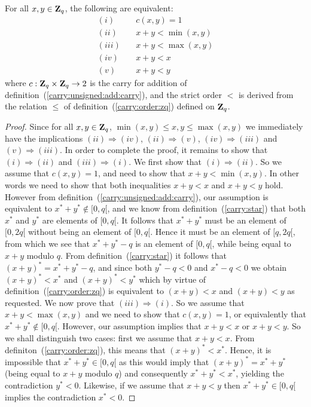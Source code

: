 \documentclass{article}
\newcommand{\zq}{\mbox{${\bf Z}_{q}$}}
\begin{document}
\begin{prop}\label{carry:unsigned:add:criterium}
  For all $x,y\in\zq$, the following are equivalent:
    \begin{eqnarray*}
      (i)&\ &c(x,y) = 1\\
      (ii)&\ & x + y < \min(x,y)\\
      (iii)&\ & x + y < \max(x,y)\\
      (iv)&\ & x + y < x\\
      (v) &\ & x + y < y
    \end{eqnarray*}
where $c:\zq\times\zq\rightarrow 2$ is the carry for addition of 
  definition~(\ref{carry:unsigned:add:carry}), and the strict order $<$
  is derived from the relation $\leq$ of 
  definition~(\ref{carry:order:zq}) defined on \zq.
\end{prop}
\begin{proof}
  Since for all $x,y\in\zq$, $\min(x,y)\leq x, y\leq\max(x,y)$ we immediately 
  have the implications $(ii)\Rightarrow(iv)$, $(ii)\Rightarrow(v)$, 
  $(iv)\Rightarrow(iii)$ and $(v)\Rightarrow(iii)$. In order to complete
  the proof, it remains to show that $(i)\Rightarrow(ii)$ and 
  $(iii)\Rightarrow(i)$. We first show that $(i)\Rightarrow(ii)$. So 
  we assume that $c(x,y) = 1$, and need to show that $x+y<\min(x,y)$.
  In other words we need to show that both inequalities $x+y<x$ and 
  $x+y<y$ hold. However from definition~(\ref{carry:unsigned:add:carry}),
  our assumption is equivalent to $x^{*}+y^{*}\not\in[0,q[$, and we know
  from definition~(\ref{carry:star}) that both $x^{*}$ and $y^{*}$ are elements
  of $[0,q[$. It follows that $x^{*}+y^{*}$ must be an element of $[0,2q[$
  without being an element of $[0,q[$. Hence it must be an element of
  $[q,2q[$, from which we see that $x^{*}+y^{*}-q$ is an element of $[0,q[$,
  while being equal to $x+y$ modulo $q$. From definition~(\ref{carry:star})
  it follows that $(x+y)^{*}=x^{*}+y^{*}-q$, and since both $y^{*}-q <0$ and 
  $x^{*}-q<0$ we obtain $(x+y)^{*}<x^{*}$ and $(x+y)^{*}<y^{*}$ which by
  virtue of definition~(\ref{carry:order:zq}) is equivalent to $(x+y)<x$ and 
  $(x+y)<y$ as requested. We now prove that $(iii)\Rightarrow(i)$. So we
  assume that $x+y <\max(x,y)$ and we need to show that $c(x,y)=1$, or
  equivalently that $x^{*}+y^{*}\not\in[0,q[$. However, our assumption
  implies that $x+y<x$ or $x+y<y$. So we shall distinguish two cases:
  first we assume that $x+y<x$. From definiton~(\ref{carry:order:zq}), 
  this means that $(x+y)^{*}<x^{*}$. Hence, it is impossible that 
  $x^{*}+y^{*}\in[0,q[$ as this would imply that $(x+y)^{*}=x^{*}+y^{*}$ 
  (being equal to $x+y$ modulo $q$) and consequently $x^{*}+y^{*}<x^{*}$, 
  yielding the contradiction $y^{*}<0$. Likewise, if we assume that $x+y<y$ 
  then $x^{*}+y^{*}\in[0,q[$ implies the contradiction $x^{*}<0$.
\end{proof}
\end{document}
